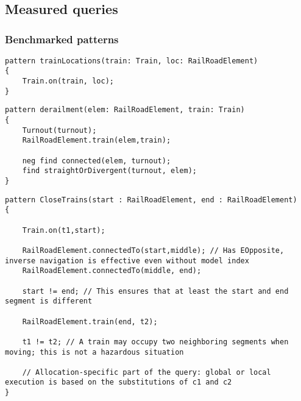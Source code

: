 \appendix
\chapter*{\fuggelek}
\setcounter{chapter}{\appendixnumber}

\section{Measured queries}


\subsection{Benchmarked patterns}

\begin{lstlisting}[language = vql]
pattern trainLocations(train: Train, loc: RailRoadElement)
{
	Train.on(train, loc);
}
\end{lstlisting}

\begin{lstlisting}[language = vql]
pattern derailment(elem: RailRoadElement, train: Train)
{
	Turnout(turnout);
	RailRoadElement.train(elem,train);
	
	neg find connected(elem, turnout);
	find straightOrDivergent(turnout, elem);
}
\end{lstlisting}

\begin{lstlisting}[language = vql]
pattern CloseTrains(start : RailRoadElement, end : RailRoadElement)
{
	
	Train.on(t1,start);
	
	RailRoadElement.connectedTo(start,middle); // Has EOpposite, inverse navigation is effective even without model index
	RailRoadElement.connectedTo(middle, end);
	
	start != end; // This ensures that at least the start and end segment is different
	
	RailRoadElement.train(end, t2);
	
	t1 != t2; // A train may occupy two neighboring segments when moving; this is not a hazardous situation
	
	// Allocation-specific part of the query: global or local execution is based on the substitutions of c1 and c2
}
\end{lstlisting}

